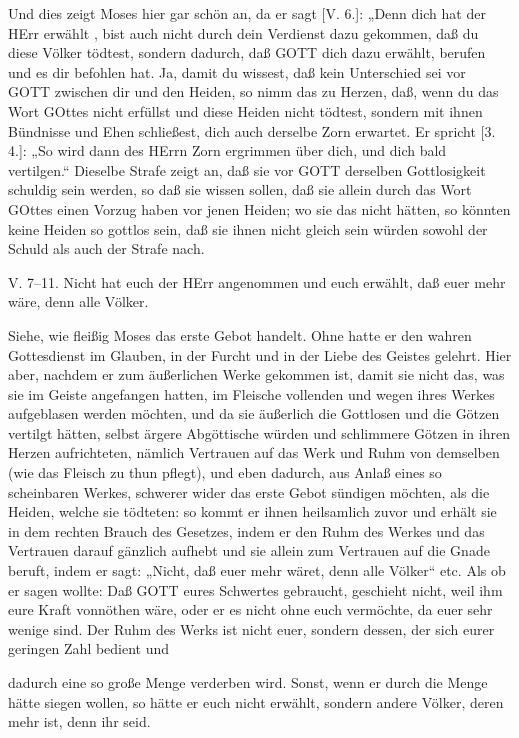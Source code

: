 Und dies zeigt Moses hier gar schön an, da er sagt [V. 6.]: „Denn dich hat der HErr erwählt
, bist auch nicht durch dein Verdienst dazu gekommen, daß du diese Völker tödtest, sondern dadurch, daß GOTT dich dazu erwählt, berufen und es dir befohlen hat. Ja, damit du wissest, daß kein Unterschied sei vor GOTT zwischen dir und den Heiden, so nimm das zu Herzen, daß, wenn du das Wort GOttes nicht erfüllst und diese Heiden nicht tödtest, sondern mit ihnen Bündnisse und Ehen schließest, dich auch derselbe Zorn erwartet. Er spricht [3. 4.]: „So wird dann des HErrn Zorn ergrimmen über dich, und dich bald vertilgen.“ Dieselbe Strafe zeigt an, daß sie vor GOTT derselben Gottlosigkeit schuldig sein werden, so daß sie wissen sollen, daß sie allein durch das Wort GOttes einen Vorzug haben vor jenen Heiden; wo sie das nicht hätten, so könnten keine Heiden so gottlos sein, daß sie ihnen nicht gleich sein würden sowohl der Schuld als auch der Strafe nach.

\begin{schriftzitat}
V. 7–11. Nicht hat euch der HErr angenommen und euch erwählt, daß euer mehr wäre, denn alle Völker.
\end{schriftzitat}

Siehe, wie fleißig Moses das erste Gebot handelt. Ohne hatte er den wahren Gottesdienst im Glauben, in der Furcht und in der Liebe des Geistes gelehrt. Hier aber, nachdem er zum äußerlichen Werke gekommen ist, damit sie nicht das, was sie im Geiste angefangen hatten, im Fleische vollenden und wegen ihres Werkes aufgeblasen werden möchten, und da sie äußerlich die Gottlosen und die Götzen vertilgt hätten, selbst ärgere Abgöttische würden und schlimmere Götzen in ihren Herzen aufrichteten, nämlich Vertrauen auf das Werk und Ruhm von demselben (wie das Fleisch zu thun pflegt), und eben dadurch, aus Anlaß eines so scheinbaren Werkes, schwerer wider das erste Gebot sündigen möchten, als die Heiden, welche sie tödteten: so kommt er ihnen heilsamlich zuvor und erhält sie in dem rechten Brauch des Gesetzes, indem er den Ruhm des Werkes und das Vertrauen darauf gänzlich aufhebt und sie allein zum Vertrauen auf die Gnade beruft, indem er sagt: „Nicht, daß euer mehr wäret, denn alle Völker“ etc. Als ob er sagen wollte: Daß GOTT eures Schwertes gebraucht, geschieht nicht, weil ihm eure Kraft vonnöthen wäre, oder er es nicht ohne euch vermöchte, da euer sehr wenige sind. Der Ruhm des Werks ist nicht euer, sondern dessen, der sich eurer geringen Zahl bedient und

dadurch eine so große Menge verderben wird. Sonst, wenn er durch die Menge hätte siegen wollen, so hätte er euch nicht erwählt, sondern andere Völker, deren mehr ist, denn ihr seid.

